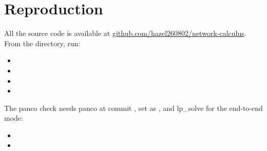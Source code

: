 \documentclass[9pt,a4paper,twocolumn,twoside]{tau-class/tau}
\begin{document}

\section*{Reproduction}

    All the source code is available at \href{https://github.com/hazel260802/network-calculus}{github.com/hazel260802/network-calculus}. From the  directory, run:
    \begin{itemize}
        \item {}
        \item {}
        \item {}
        \item {}
    \end{itemize}
    The panco check needs panco at commit , set as , and lp\_solve for the end-to-end mode:
    \begin{itemize}
        \item {}
        \item {}
    \end{itemize}


\printbibliography
\end{document}
